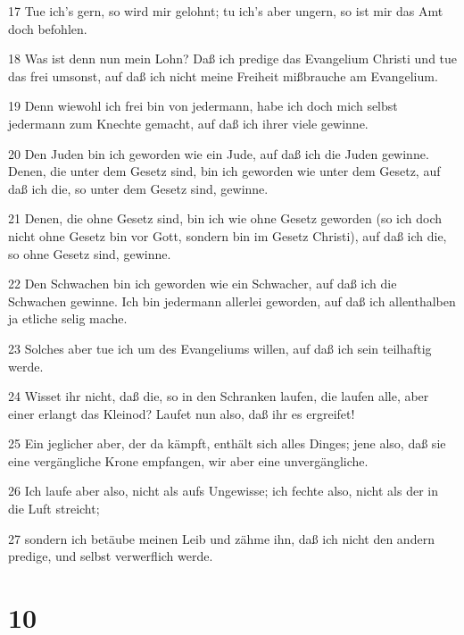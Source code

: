 \par 17 Tue ich's gern, so wird mir gelohnt; tu ich's aber ungern, so ist mir das Amt doch befohlen.
\par 18 Was ist denn nun mein Lohn? Daß ich predige das Evangelium Christi und tue das frei umsonst, auf daß ich nicht meine Freiheit mißbrauche am Evangelium.
\par 19 Denn wiewohl ich frei bin von jedermann, habe ich doch mich selbst jedermann zum Knechte gemacht, auf daß ich ihrer viele gewinne.
\par 20 Den Juden bin ich geworden wie ein Jude, auf daß ich die Juden gewinne. Denen, die unter dem Gesetz sind, bin ich geworden wie unter dem Gesetz, auf daß ich die, so unter dem Gesetz sind, gewinne.
\par 21 Denen, die ohne Gesetz sind, bin ich wie ohne Gesetz geworden (so ich doch nicht ohne Gesetz bin vor Gott, sondern bin im Gesetz Christi), auf daß ich die, so ohne Gesetz sind, gewinne.
\par 22 Den Schwachen bin ich geworden wie ein Schwacher, auf daß ich die Schwachen gewinne. Ich bin jedermann allerlei geworden, auf daß ich allenthalben ja etliche selig mache.
\par 23 Solches aber tue ich um des Evangeliums willen, auf daß ich sein teilhaftig werde.
\par 24 Wisset ihr nicht, daß die, so in den Schranken laufen, die laufen alle, aber einer erlangt das Kleinod? Laufet nun also, daß ihr es ergreifet!
\par 25 Ein jeglicher aber, der da kämpft, enthält sich alles Dinges; jene also, daß sie eine vergängliche Krone empfangen, wir aber eine unvergängliche.
\par 26 Ich laufe aber also, nicht als aufs Ungewisse; ich fechte also, nicht als der in die Luft streicht;
\par 27 sondern ich betäube meinen Leib und zähme ihn, daß ich nicht den andern predige, und selbst verwerflich werde.

\chapter{10}

